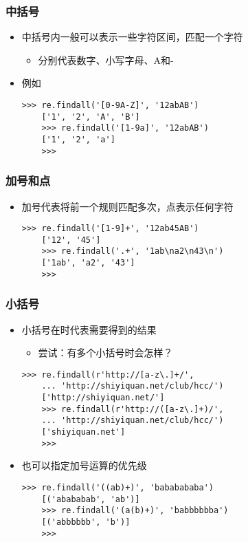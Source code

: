 \begin{frame} [fragile]
	\frametitle{中括号}
	\linespread{1.5}
	\begin{itemize}
	\item 中括号内一般可以表示一些字符区间，匹配一个字符
		\begin{itemize}
		\item \inlineListing{[0-9a-zA\-]} 分别代表数字、小写字母、A和-
		\end{itemize}
	\item 例如
	\begin{lstlisting}[style=pythonstyle, gobble=4, texcl]
	>>> re.findall('[0-9A-Z]', '12abAB')
	['1', '2', 'A', 'B']
	>>> re.findall('[1-9a]', '12abAB')
	['1', '2', 'a']
	>>>
	\end{lstlisting}
	\end{itemize}
\end{frame}

\begin{frame} [fragile]
	\frametitle{加号和点}
	\linespread{1.25}
	\begin{itemize}
	\item 加号代表将前一个规则匹配多次，点表示任何字符
	\begin{lstlisting}[style=pythonstyle, gobble=4, texcl]
	>>> re.findall('[1-9]+', '12ab45AB')
	['12', '45']
	>>> re.findall('.+', '1ab\na2\n43\n')
	['1ab', 'a2', '43']
	>>>
	\end{lstlisting}
	\end{itemize}
\end{frame}

\begin{frame} [fragile]
	\frametitle{小括号}
	\begin{itemize}
	\item 小括号在时代表需要得到的结果
		\begin{itemize}
		\item 尝试：有多个小括号时会怎样？
		\end{itemize}
	\begin{lstlisting}[style=pythonstyle, gobble=4, texcl]
	>>> re.findall(r'http://[a-z\.]+/',
	... 'http://shiyiquan.net/club/hcc/')
	['http://shiyiquan.net/']
	>>> re.findall(r'http://([a-z\.]+)/',
	... 'http://shiyiquan.net/club/hcc/')
	['shiyiquan.net']
	>>>
	\end{lstlisting}
	\item 也可以指定加号运算的优先级
	\begin{lstlisting}[style=pythonstyle, gobble=4, texcl]
	>>> re.findall('((ab)+)', 'bababababa')
	[('abababab', 'ab')]
	>>> re.findall('(a(b)+)', 'babbbbbba')
	[('abbbbbb', 'b')]
	>>>
	\end{lstlisting}
	\end{itemize}
\end{frame}

